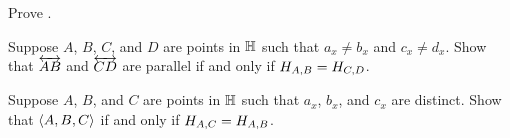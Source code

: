 \Exercises%

\begin{exercise}
Prove .
\end{exercise}


\begin{exercise}\label{exerc:hhp-parallel-criterion}
Suppose \(A\), \(B\), \(C\), and \(D\) are points in \(\mathbb{H}\) such that \(a_x \neq b_x\) and \(c_x \neq d_x\).
Show that \(\overleftrightarrow{AB}\) and \(\overleftrightarrow{CD}\) are parallel if and only if \(H_{A,B} = H_{C,D}\).
\end{exercise}


\begin{exercise}\label{exerc:hhp-collinearity-criterion}
Suppose \(A\), \(B\), and \(C\) are points in \(\mathbb{H}\) such that \(a_x\), \(b_x\), and \(c_x\) are distinct.
Show that \(\langle A, B, C \rangle\) if and only if \(H_{A,C} = H_{A,B}\).
\end{exercise}
